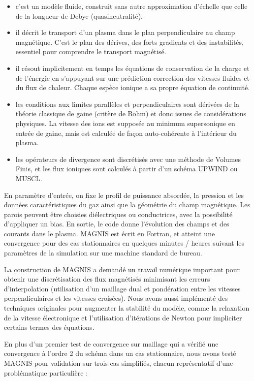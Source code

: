 \begin{itemize}
  \item c'est un modèle fluide, construit sans autre approximation
  d'échelle que celle de la longueur de Debye (quasineutralité).
  \item il décrit le transport d'un plasma dans le
  plan perpendiculaire au champ magnétique. C'est le plan des dérives, des forts
  gradients et des instabilités, essentiel pour comprendre le transport
  magnétisé.
  \item il résout implicitement en temps les équations de conservation de la
  charge et de l'énergie en s'appuyant sur une prédiction-correction des
  vitesses fluides et du flux de chaleur. Chaque espèce ionique a sa propre
  équation de continuité.
  \item  les conditions aux limites parallèles et perpendiculaires sont 
 dérivées de la théorie classique de gaine (critère de Bohm) et donc issues de
 considérations physiques. La vitesse des ions est supposée au minimum
 supersonique en entrée de gaine, mais est calculée de façon auto-cohérente à l'intérieur du plasma.
 \item les opérateurs de divergence sont discrétisés avec une méthode de Volumes
 Finis, et les flux ioniques sont calculés à partir d'un schéma UPWIND ou MUSCL.
 \end{itemize} 

En paramètre d'entrée, on fixe le profil de puissance absordée, la
 pression et les données caractéristiques du gaz ainsi que la géométrie du champ
 magnétique. Les parois peuvent être choisies diélectriques ou conductrices,
 avec la possibilité d'appliquer un bias. En sortie, le code donne l'évolution
 des champs et des courants dans le plasma. MAGNIS est écrit en Fortran,
 et atteint une convergence pour des cas stationnaires en quelques minutes /
 heures suivant les paramètres de la simulation sur une machine standard de bureau.

La construction de MAGNIS a demandé un travail numérique
important pour obtenir une discrétisation des flux
magnétisés minimisant les erreurs d'interpolation (utilisation d'un maillage
dual et pondération entre les vitesses perpendiculaires et les vitesses
croisées). Nous avons aussi implémenté des techniques originales pour augmenter
la stabilité du modèle, comme la relaxation de la vitesse électronique et
l'utilisation d'itérations de Newton pour impliciter certains termes des
équations.

En plus d'un premier test de convergence sur maillage qui a vérifié une
convergence à l'ordre 2 du schéma dans un cas stationnaire, nous avons testé
MAGNIS pour validation sur trois cas simplifiés, chacun représentatif d'une
problématique particulière :

